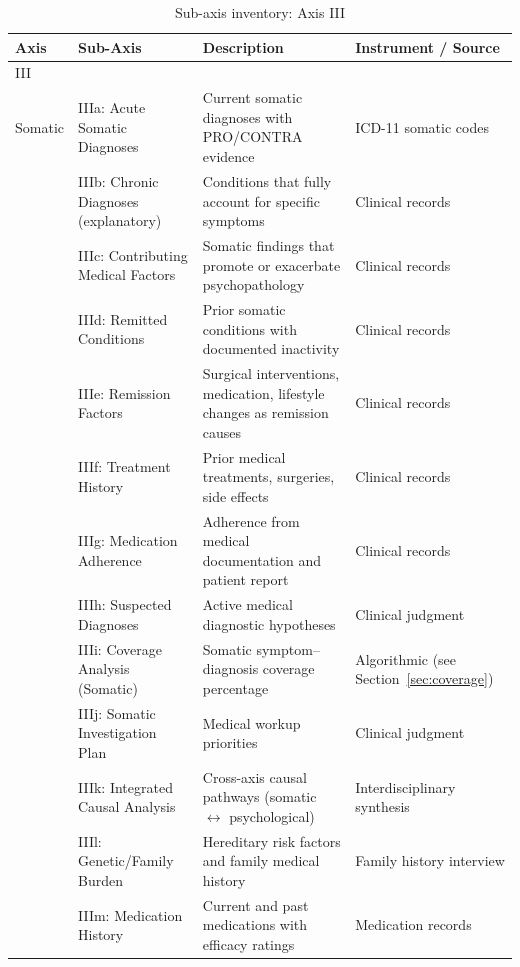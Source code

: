 \documentclass[11pt,a4paper]{article}
\newenvironment{CompactLongTable}{%
  \begingroup
  \footnotesize
  \setstretch{1.0}%
  \setlength{\LTpre}{0pt}%
  \setlength{\LTpost}{0pt}%
}{%
  \endgroup
}
\begin{document}
\begin{table}[H]
\centering
\caption{Sub-axis inventory: Axis III}
\label{tab:subaxes_part2}
\begin{CompactLongTable}
\begin{tabular}{@{}L{1.8cm}L{2.4cm}L{5.0cm}L{4.0cm}@{}}
\toprule
\textbf{Axis} & \textbf{Sub-Axis} & \textbf{Description} & \textbf{Instrument / Source} \\
\midrule
III\\Somatic & IIIa: Acute Somatic Diagnoses & Current somatic diagnoses with PRO/CONTRA evidence & ICD-11 somatic codes \\
 & IIIb: Chronic Diagnoses (explanatory) & Conditions that fully account for specific symptoms & Clinical records \\
 & IIIc: Contributing Medical Factors & Somatic findings that promote or exacerbate psychopathology & Clinical records \\
 & IIId: Remitted Conditions & Prior somatic conditions with documented inactivity & Clinical records \\
 & IIIe: Remission Factors & Surgical interventions, medication, lifestyle changes as remission causes & Clinical records \\
 & IIIf: Treatment History & Prior medical treatments, surgeries, side effects & Clinical records \\
 & IIIg: Medication Adherence & Adherence from medical documentation and patient report & Clinical records \\
 & IIIh: Suspected Diagnoses & Active medical diagnostic hypotheses & Clinical judgment \\
 & IIIi: Coverage Analysis (Somatic) & Somatic symptom--diagnosis coverage percentage & Algorithmic (see Section~\ref{sec:coverage}) \\
 & IIIj: Somatic Investigation Plan & Medical workup priorities & Clinical judgment \\
 & IIIk: Integrated Causal Analysis & Cross-axis causal pathways (somatic $\leftrightarrow$ psychological) & Interdisciplinary synthesis \\
 & IIIl: Genetic/Family Burden & Hereditary risk factors and family medical history & Family history interview \\
 & IIIm: Medication History & Current and past medications with efficacy ratings & Medication records \\
\bottomrule
\end{tabular}
\end{CompactLongTable}
\end{table}
\end{document}
